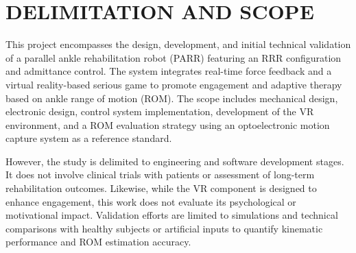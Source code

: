 \chapter{DELIMITATION AND SCOPE}\label{delimitation_scope}
\graphicspath{{images/}}

This project encompasses the design, development, and initial technical validation of a parallel ankle rehabilitation robot (PARR) featuring an RRR configuration and admittance control. The system integrates real-time force feedback and a virtual reality-based serious game to promote engagement and adaptive therapy based on ankle range of motion (ROM). The scope includes mechanical design, electronic design, control system implementation, development of the VR environment, and a ROM evaluation strategy using an optoelectronic motion capture system as a reference standard.

However, the study is delimited to engineering and software development stages. It does not involve clinical trials with patients or assessment of long-term rehabilitation outcomes. Likewise, while the VR component is designed to enhance engagement, this work does not evaluate its psychological or motivational impact. Validation efforts are limited to simulations and technical comparisons with healthy subjects or artificial inputs to quantify kinematic performance and ROM estimation accuracy.
 